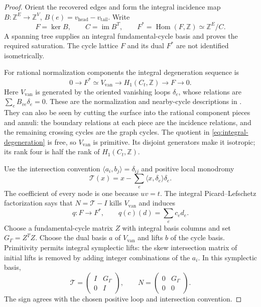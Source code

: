 \begin{proof}
Orient the recovered edges and form
the integral incidence map
$B:\mathbb Z^E\to\mathbb Z^V$,
$B(e)=v_{\mathrm{head}}-v_{\mathrm{tail}}$.
Write
\[
 F=\ker B,\qquad C=\operatorname{im}B^T,\qquad
 F^*=\operatorname{Hom}(F,\mathbb Z)
              \simeq\mathbb Z^E/C.
\]
A spanning tree supplies an integral
fundamental-cycle basis and proves
the required saturation. The cycle
lattice $F$ and its dual $F^*$ are
not identified isometrically.

For rational normalization components
the integral degeneration sequence is
\begin{equation}\label{eq:integral-degeneration}
 0\longrightarrow F^*\simeq V_{\mathrm{van}}
 \longrightarrow H_1(C_t,\mathbb Z)
 \longrightarrow F\longrightarrow0 .
\end{equation}
Here $V_{\mathrm{van}}$ is generated
by the oriented vanishing loops
$\delta_e$, whose relations are
$\sum_eB_{ve}\delta_e=0$.
These are the normalization and
nearby-cycle descriptions in
\cite[Proposition~7.3.3 and Remark~7.4.2]{achinger-ogus}.
They can also be seen by cutting
the surface into the rational
component pieces and annuli:
the boundary relations at each
piece are the incidence relations,
and the remaining crossing cycles
are the graph cycles.
The quotient in
\eqref{eq:integral-degeneration}
is free, so $V_{\mathrm{van}}$ is
primitive. Its disjoint generators
make it isotropic; its rank four
is half the rank of $H_1(C_t,\mathbb Z)$.

Use the intersection convention
$\langle a_i,b_j\rangle=\delta_{ij}$
and positive local monodromy
\[
 \mathcal T(x)=x-\sum_e\langle x,\delta_e\rangle\delta_e .
\]
The coefficient of every node is
one because $uv=t$.
The integral Picard--Lefschetz
factorization
\cite[Theorem~7.4.1, Corollary~7.4.3
and Proposition~7.4.4]{achinger-ogus}
says that $N=\mathcal T-I$ kills
$V_{\mathrm{van}}$ and induces
\[
 q:F\longrightarrow F^*,\qquad
 q(c)(d)=\sum_e c_ed_e .
\]
Choose a fundamental-cycle matrix
$Z$ with integral basis columns
and set $G_\Gamma=Z^TZ$.
Choose the dual basis $a$ of
$V_{\mathrm{van}}$ and lifts $b$
of the cycle basis. Primitivity
permits integral symplectic lifts:
the skew intersection matrix of
initial lifts is removed by adding
integer combinations of the $a_i$.
In this symplectic basis,
\begin{equation}\label{eq:monodromy-matrix}
 \mathcal T=\begin{pmatrix}I&G_\Gamma\\0&I\end{pmatrix},
 \qquad N=\begin{pmatrix}0&G_\Gamma\\0&0\end{pmatrix}.
\end{equation}
The sign agrees with the chosen
positive loop and intersection
convention.


\end{proof}
